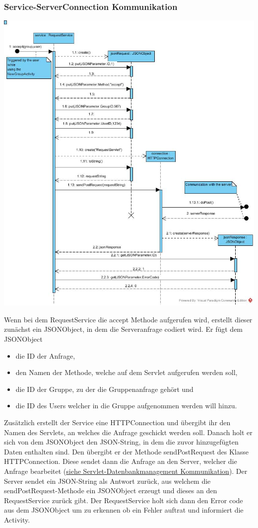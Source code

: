 \subsubsection{Service-ServerConnection Kommunikation}
\includegraphics[width=1.1\textwidth]{Service_ServerConnection.jpg}

Wenn bei dem RequestService die accept Methode aufgerufen wird, erstellt dieser zunächst ein JSONObject, in dem die Serveranfrage codiert wird. Er fügt dem JSONObject
\begin{itemize}
\item  die ID der Anfrage,
\item den Namen der Methode, welche auf dem Servlet aufgerufen werden soll,
\item die ID der Gruppe, zu der die Gruppenanfrage gehört und
\item die ID des Users welcher in die Gruppe aufgenommen werden will hinzu.
\end{itemize}
Zusätzlich erstellt der Service eine HTTPConnection und übergibt ihr den Namen des Servlets, an welches die Anfrage geschickt werden soll.
Danach holt er sich von dem JSONObject den JSON-String, in dem die zuvor hinzugefügten Daten enthalten sind. Den übergibt er der Methode sendPostRequest des Klasse HTTPConnection.
Diese sendet dann die Anfrage an den Server, welcher die Anfrage bearbeitet (\hyperlink{ServletDatenbank}{siehe Servlet-Datenbankmanagement Kommunikation}). Der Server sendet ein JSON-String als Antwort zurück, aus welchem die sendPostRequest-Methode ein JSONObject erzeugt und dieses an den RequestService zurück gibt. Der RequestService holt sich dann den Error code aus dem JSONObject um zu erkennen ob ein Fehler auftrat und informiert die Activity.



